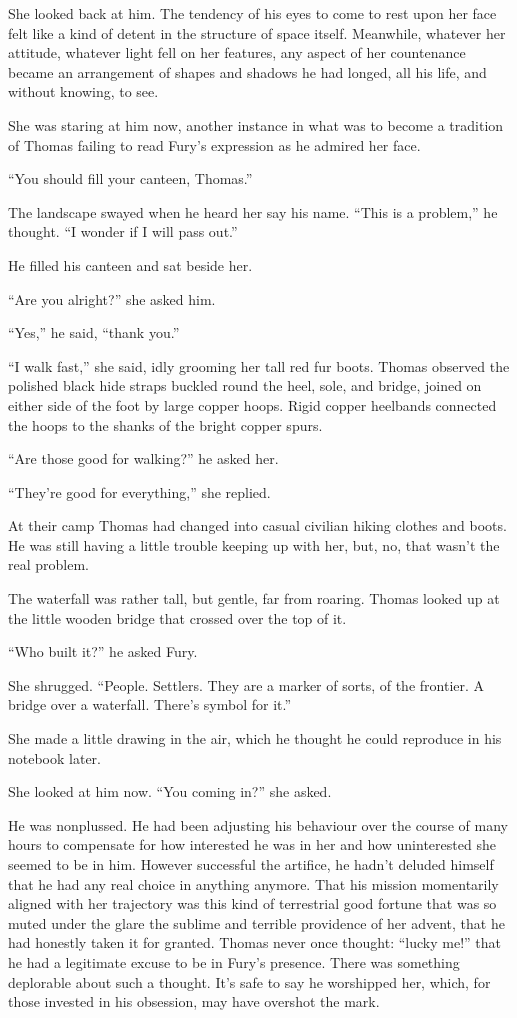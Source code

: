 \documentclass[11pt,a5paper]{article}
\begin{document}
She looked back at him. The tendency of his eyes to come to rest upon her face felt like a kind of detent in the structure of space itself. Meanwhile, whatever her attitude, whatever light fell on her features, any aspect of her countenance became an arrangement of shapes and shadows he had longed, all his life, and without knowing, to see.

She was staring at him now, another instance in what was to become a tradition of Thomas failing to read Fury's expression as he admired her face.

``You should fill your canteen, Thomas.''

The landscape swayed when he heard her say his name. ``This is a problem,'' he thought. ``I wonder if I will pass out.''

He filled his canteen and sat beside her.

``Are you alright?'' she asked him.

``Yes,'' he said, ``thank you.''

``I walk fast,'' she said, idly grooming her tall red fur boots. Thomas observed the polished black hide straps buckled round the heel, sole, and bridge, joined on either side of the foot by large copper hoops. Rigid copper heelbands connected the hoops to the shanks of the bright copper spurs.

``Are those good for walking?'' he asked her.

``They're good for everything,'' she replied.

At their camp Thomas had changed into casual civilian hiking clothes and boots. He was still having a little trouble keeping up with her, but, no, that wasn't the real problem.

The waterfall was rather tall, but gentle, far from roaring. Thomas looked up at the little wooden bridge that crossed over the top of it.

``Who built it?'' he asked Fury.

She shrugged. ``People. Settlers. They are a marker of sorts, of the frontier. A bridge over a waterfall. There's symbol for it.''

She made a little drawing in the air, which he thought he could reproduce in his notebook later.

She looked at him now. ``You coming in?'' she asked.

He was nonplussed. He had been adjusting his behaviour over the course of many hours to compensate for how interested he was in her and how uninterested she seemed to be in him. However successful the artifice, he hadn't deluded himself that he had any real choice in anything anymore. That his mission momentarily aligned with her trajectory was this kind of terrestrial good fortune that was so muted under the glare the sublime and terrible providence of her advent, that he had honestly taken it for granted. Thomas never once thought: ``lucky me!'' that he had a legitimate excuse to be in Fury's presence. There was something deplorable about such a thought. It's safe to say he worshipped her, which, for those invested in his obsession, may have overshot the mark.
\end{document}
